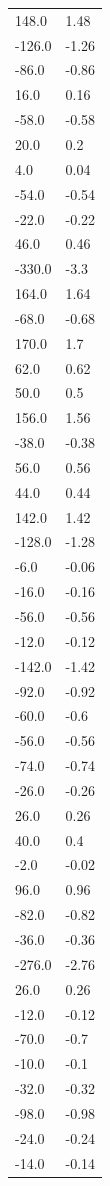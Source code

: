 \begin{longtable}{ll}
148.0 & 1.48 \\
-126.0 & -1.26 \\
-86.0 & -0.86 \\
16.0 & 0.16 \\
-58.0 & -0.58 \\
20.0 & 0.2 \\
4.0 & 0.04 \\
-54.0 & -0.54 \\
-22.0 & -0.22 \\
46.0 & 0.46 \\
-330.0 & -3.3 \\
164.0 & 1.64 \\
-68.0 & -0.68 \\
170.0 & 1.7 \\
62.0 & 0.62 \\
50.0 & 0.5 \\
156.0 & 1.56 \\
-38.0 & -0.38 \\
56.0 & 0.56 \\
44.0 & 0.44 \\
142.0 & 1.42 \\
-128.0 & -1.28 \\
-6.0 & -0.06 \\
-16.0 & -0.16 \\
-56.0 & -0.56 \\
-12.0 & -0.12 \\
-142.0 & -1.42 \\
-92.0 & -0.92 \\
-60.0 & -0.6 \\
-56.0 & -0.56 \\
-74.0 & -0.74 \\
-26.0 & -0.26 \\
26.0 & 0.26 \\
40.0 & 0.4 \\
-2.0 & -0.02 \\
96.0 & 0.96 \\
-82.0 & -0.82 \\
-36.0 & -0.36 \\
-276.0 & -2.76 \\
26.0 & 0.26 \\
-12.0 & -0.12 \\
-70.0 & -0.7 \\
-10.0 & -0.1 \\
-32.0 & -0.32 \\
-98.0 & -0.98 \\
-24.0 & -0.24 \\
-14.0 & -0.14 \\

\end{longtable}
